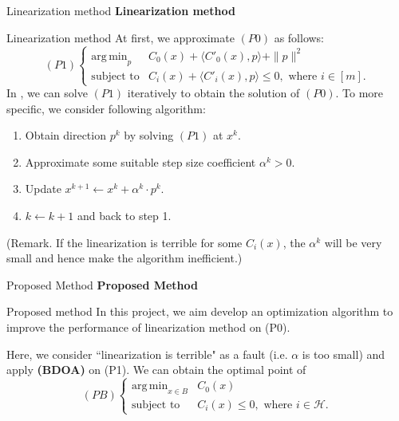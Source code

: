 \documentclass{beamer}
\DeclareMathOperator*{\argmin}{arg\,min}
\begin{document}
\begin{frame}{Linearization method}
    \centering
    \textbf{Linearization method}
\end{frame}

\begin{frame}{Linearization method}
At first, we approximate $(P0)$ as follows:
$$
(P1)
\begin{cases}
    \argmin_{p} &C_0(x) + \langle C'_0(x), p\rangle + \|p\|^2 \\
    \text{subject to} &C_i(x) + \langle C'_i(x), p\rangle \leq 0, \text{ where } i \in [m].\label{P1}
\end{cases}
$$
In \cite{wilson2012linearization}, we can solve $(P1)$ iteratively to obtain the solution of $(P0)$. To more specific, we consider following algorithm:
\begin{enumerate}
    \item Obtain direction $p^k$ by solving $(P1)$ at $x^k$.
    \item \alert{Approximate some suitable step size coefficient $\alpha^k > 0$}.
    \item Update $x^{k+1}\leftarrow x^k + \alpha^k \cdot p^k$.
    \item $k \leftarrow k+1$ and back to step 1.
\end{enumerate}
\alert{(Remark. If the linearization is terrible for some $C_i(x)$, the $\alpha^k$ will be very small and hence make the algorithm inefficient.)}
\end{frame}

\begin{frame}{Proposed Method}
\centering
\textbf{Proposed Method}
\end{frame}

\begin{frame}{Proposed method}
In this project, we aim develop an optimization algorithm to improve the performance of linearization method on (P0).
\newline

Here, we consider \alert{``linearization is terrible" as a fault} (i.e. $\alpha$ is too small) and apply \textbf{(BDOA)} on (P1). We can obtain the optimal point of 
$$
(PB)
\begin{cases}
    \argmin_{x\in B} &C_0(x)\\
    \text{subject to} &C_i(x) \leq 0, \text{ where } i \in \mathcal{H}.
\end{cases}
$$
\end{frame}
\end{document}
